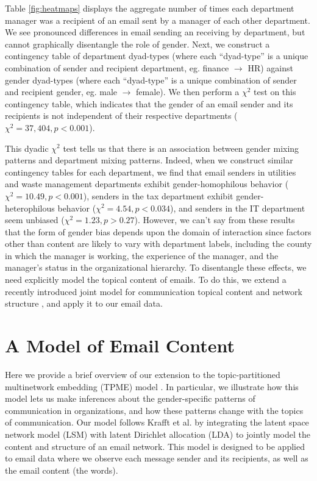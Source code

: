 \documentclass{pnastwo}
\begin{document}
\begin{article}
Table \ref{fig:heatmaps} displays the aggregate number of times each department manager was a recipient of an email sent by a manager of each other department. We see pronounced differences in email sending an receiving by department, but cannot graphically disentangle the role of gender. 
Next, we construct a contingency table of department dyad-types (where each ``dyad-type'' is a unique combination of sender and recipient department, eg. finance $\longrightarrow$ HR) against gender dyad-types (where each ``dyad-type'' is a unique combination of sender and recipient gender, eg. male $\longrightarrow$ female).  We then perform a $\chi^2$ test on this contingency table, which indicates that the gender of an email sender and its recipients is not independent of their respective departments ($\chi^2 = 37,404, p < 0.001$).
	
	
This dyadic $\chi^2$ test tells us that there is an association between gender mixing patterns and department mixing patterns. Indeed, when we construct similar contingency tables for each department, we find that email senders in utilities and waste management departments exhibit gender-homophilous behavior ($\chi^2 = 10.49, p < 0.001$), senders in the tax department exhibit gender-heterophilous behavior ($\chi^2 = 4.54, p < 0.034$), and senders in the IT department seem unbiased ($\chi^2 = 1.23, p > 0.27$). However, we can't say from these results that the form of gender bias depends upon the domain of interaction since factors other than content are likely to vary with department labels, including the county in which the manager is working, the experience of the manager, and the manager's status in the organizational hierarchy. To disentangle these effects, we need explicitly model the topical content of emails. To do this, we extend a recently introduced joint model for communication topical content and network structure \citep{Krafft2012}, and apply it to our email data.
	


\section{A Model of Email Content}
Here we provide a brief overview of our extension to the topic-partitioned
multinetwork embedding (TPME) model \citep{Krafft2012}. In particular, we illustrate how this model lets us make inferences about the gender-specific patterns of communication in organizations, and how these patterns change with the topics of communication. Our model follows Krafft et al. \citep{Krafft2012} by integrating the latent space network model (LSM) \citep{Hoff2002a} with latent Dirichlet allocation (LDA) \cite{Blei2003} to jointly model the content and structure of an email network. This model is designed to be applied to email data where we observe each message sender and its recipients, as well as the email content (the words). 


\end{article}
\end{document}
